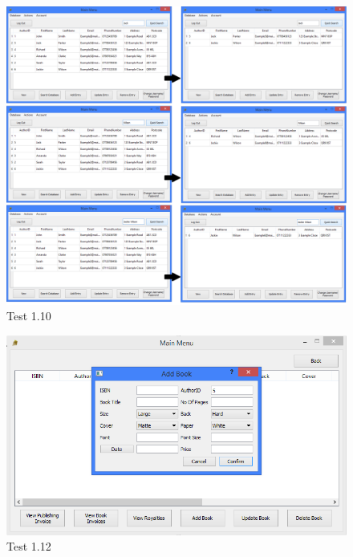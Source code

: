 \begin{landscape}
\begin{figure}[H]
    \includegraphics[width=\textwidth]{./Testing/Evidence/QuickSearchButtonTest.png}
    \caption{Test 1.10}  \label{fig:QuickSearchButtonTest}
\end{figure}

\begin{figure}[H]
    \includegraphics[width=\textwidth]{./Testing/Evidence/AddBookButtonTest.png}
    \caption{Test 1.12}  \label{fig:AddBookButtonTest}
\end{figure}


\end{landscape}
